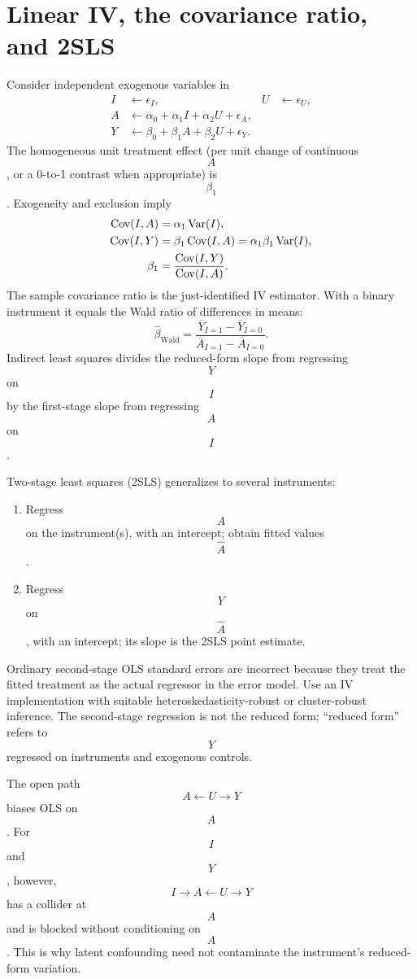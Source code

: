 \section{Linear IV, the covariance ratio, and 2SLS}
Consider independent exogenous variables in
\begin{align}
I&\leftarrow\epsilon_I, & U&\leftarrow\epsilon_U,\\
A&\leftarrow\alpha_0+\alpha_1 I+\alpha_2 U+\epsilon_A,\\
Y&\leftarrow\beta_0+\beta_1 A+\beta_2 U+\epsilon_Y.
\end{align}
The homogeneous unit treatment effect (per unit change of continuous $$A$$, or a 0-to-1 contrast when appropriate) is $$\beta_1$$. Exogeneity and exclusion imply
\begin{align}
\operatorname{Cov}(I,A)&=\alpha_1\operatorname{Var}(I),\\
\operatorname{Cov}(I,Y)&=\beta_1\operatorname{Cov}(I,A)=\alpha_1\beta_1\operatorname{Var}(I),\\
\beta_1&=\frac{\operatorname{Cov}(I,Y)}{\operatorname{Cov}(I,A)}.
\end{align}
The sample covariance ratio is the just-identified IV estimator. With a binary instrument it equals the Wald ratio of differences in means:
\begin{equation}
\widehat\beta_{\mathrm{Wald}}=
\frac{\overline Y_{I=1}-\overline Y_{I=0}}
{\overline A_{I=1}-\overline A_{I=0}}.
\end{equation}
Indirect least squares divides the reduced-form slope from regressing $$Y$$ on $$I$$ by the first-stage slope from regressing $$A$$ on $$I$$.

Two-stage least squares (2SLS) generalizes to several instruments:
\begin{enumerate}
\item Regress $$A$$ on the instrument(s), with an intercept; obtain fitted values $$\widehat A$$.
\item Regress $$Y$$ on $$\widehat A$$, with an intercept; its slope is the 2SLS point estimate.
\end{enumerate}
\begin{remarkbox}
Ordinary second-stage OLS standard errors are incorrect because they treat the fitted treatment as the actual regressor in the error model. Use an IV implementation with suitable heteroskedasticity-robust or cluster-robust inference. The second-stage regression is not the reduced form; ``reduced form'' refers to $$Y$$ regressed on instruments and exogenous controls.
\end{remarkbox}
The open path $$A\leftarrow U\to Y$$ biases OLS on $$A$$. For $$I$$ and $$Y$$, however, $$I\to A\leftarrow U\to Y$$ has a collider at $$A$$ and is blocked without conditioning on $$A$$. This is why latent confounding need not contaminate the instrument's reduced-form variation.

